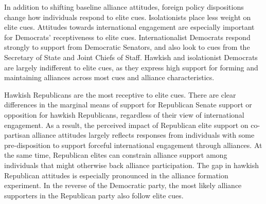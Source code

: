 \documentclass[12pt]{article}
\begin{document}
In addition to shifting baseline alliance attitudes, foreign policy dispositions change how individuals respond to elite cues. 
Isolationists place less weight on elite cues. 
Attitudes towards international engagement are especially important for Democrats' receptiveness to elite cues. 
Internationalist Democrats respond strongly to support from Democratic Senators, and also look to cues from the Secretary of State and Joint Chiefs of Staff. 
Hawkish and isolationist Democrats are largely indifferent to elite cues, as they express high support for forming and maintaining alliances across most cues and alliance characteristics. 


Hawkish Republicans are the most receptive to elite cues. 
There are clear differences in the marginal means of support for Republican Senate support or opposition for hawkish Republicans, regardless of their view of international engagement. 
As a result, the perceived impact of Republican elite support on co-partisan alliance attitudes largely reflects responses from individuals with some pre-disposition to support forceful international engagement through alliances. 
At the same time, Republican elites can constrain alliance support among individuals that might otherwise back alliance participation.
The gap in hawkish Republican attitudes is especially pronounced in the alliance formation experiment. 
In the reverse of the Democratic party, the most likely alliance supporters in the Republican party also follow elite cues. 
\end{document}
